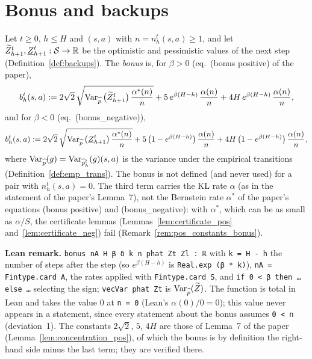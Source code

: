 \section{Bonus and backups}
\label{sec:algorithm_backups}

\begin{definition}\label{def:bonus}
\leanok
{}
Let $t \ge 0$, $h \le H$ and $(s, a)$ with $n = n_h^t(s, a) \ge 1$, and let $\widetilde{Z}^t_{h+1}, \underline{Z}^t_{h+1} : \mathcal{S} \to \mathbb{R}$
be the optimistic and pessimistic values of the next step (Definition~\ref{def:backups}). The
\emph{bonus} is, for $\beta > 0$ (eq.~(bonus positive) of the paper),
\[
  b_h^t(s, a) := 2\sqrt2\, \sqrt{\operatorname{Var}_{\widehat{p}}\big(\widetilde{Z}^t_{h+1}\big)\, \frac{\alpha^*(n)}{n}}
  + 5\, e^{\beta(H - h)}\, \frac{\alpha(n)}{n}
  + 4 H\, e^{\beta(H - h)}\, \frac{\alpha(n)}{n} ,
\]
and for $\beta < 0$ (eq.~(bonus\_negative)),
\[
  b_h^t(s, a) := 2\sqrt2\, \sqrt{\operatorname{Var}_{\widehat{p}}\big(\underline{Z}^t_{h+1}\big)\, \frac{\alpha^*(n)}{n}}
  + 5\, \big(1 - e^{\beta(H - h)}\big)\, \frac{\alpha(n)}{n}
  + 4 H\, \big(1 - e^{\beta(H - h)}\big)\, \frac{\alpha(n)}{n} ,
\]
where $\operatorname{Var}_{\widehat{p}}(g) = \operatorname{Var}_{\widehat{p}_h^t}(g)(s, a)$ is the variance under the empirical
transitions (Definition~\ref{def:emp_trans}). The bonus is not defined (and never used) for a
pair with $n_h^t(s, a) = 0$. The third term carries the KL rate $\alpha$ (as in the statement of
the paper's Lemma~7), not the Bernstein rate $\alpha^*$ of the paper's equations
(bonus positive) and (bonus\_negative): with $\alpha^*$, which can be as small as $\alpha/S$,
the certificate lemmas (Lemmas~\ref{lem:certificate_pos} and~\ref{lem:certificate_neg}) fail
(Remark~\ref{rem:pos_constants_bonus}).
\end{definition}

\textbf{Lean remark.} \texttt{bonus nA H β δ k n phat Zt Zl : ℝ} with \texttt{k = H - h} the
number of steps after the step (so $e^{\beta(H - h)}$ is \texttt{Real.exp (β * k)}),
\texttt{nA = Fintype.card A}, the rates applied with \texttt{Fintype.card S}, and
\texttt{if 0 < β then … else …} selecting the sign; \texttt{vecVar phat Zt} is $\operatorname{Var}_{\widehat{p}}(\widetilde{Z})$.
The function is total in Lean and takes the value $0$ at \texttt{n = 0} (Lean's $\alpha(0)/0 = 0$);
this value never appears in a statement, since every statement about the bonus assumes
\texttt{0 < n} (deviation~1). The constants $2\sqrt2$, $5$, $4H$ are those of Lemma~7 of the
paper (Lemma~\ref{lem:concentration_pos}), of which the bonus is by definition the right-hand
side minus the last term; they are verified there.

